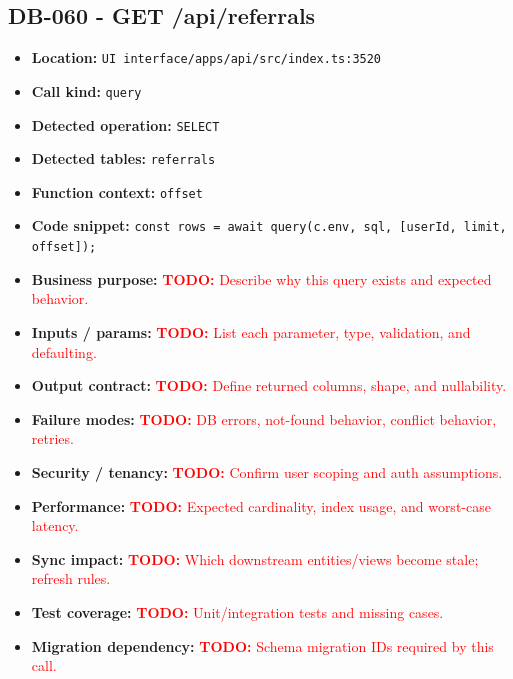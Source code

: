 \documentclass[11pt]{article}
\newcommand{\todoitem}[1]{\textcolor{red}{\textbf{TODO:} #1}}
\begin{document}
\subsection{DB-060 - GET /api/referrals}
\begin{itemize}[leftmargin=1.5em]
\item \textbf{Location:} \texttt{UI interface/apps/api/src/index.ts:3520}
\item \textbf{Call kind:} \texttt{query}
\item \textbf{Detected operation:} \texttt{SELECT}
\item \textbf{Detected tables:} \texttt{referrals}
\item \textbf{Function context:} \texttt{offset}
\item \textbf{Code snippet:} \texttt{const rows = await query(c.env, sql, [userId, limit, offset]);}
\item \textbf{Business purpose:} \todoitem{Describe why this query exists and expected behavior.}
\item \textbf{Inputs / params:} \todoitem{List each parameter, type, validation, and defaulting.}
\item \textbf{Output contract:} \todoitem{Define returned columns, shape, and nullability.}
\item \textbf{Failure modes:} \todoitem{DB errors, not-found behavior, conflict behavior, retries.}
\item \textbf{Security / tenancy:} \todoitem{Confirm user scoping and auth assumptions.}
\item \textbf{Performance:} \todoitem{Expected cardinality, index usage, and worst-case latency.}
\item \textbf{Sync impact:} \todoitem{Which downstream entities/views become stale; refresh rules.}
\item \textbf{Test coverage:} \todoitem{Unit/integration tests and missing cases.}
\item \textbf{Migration dependency:} \todoitem{Schema migration IDs required by this call.}
\end{itemize}
\end{document}
